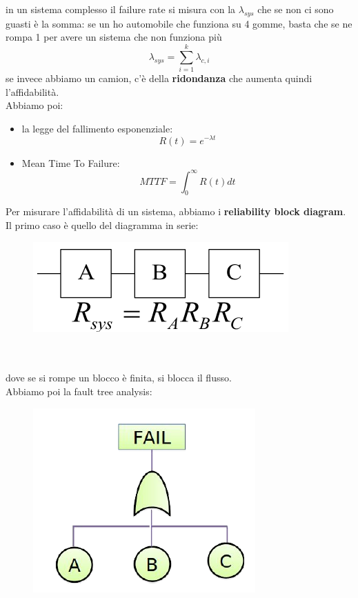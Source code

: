 \documentclass[oneside, 12pt]{extbook}
\begin{document}
in un sistema complesso il failure rate si misura con la $\lambda_{sys}$ che se non ci sono guasti è la somma: se un ho automobile che funziona su 4 gomme, basta che se ne rompa 1 per avere un sistema che non funziona più
\begin{equation}
	\lambda_{sys} = \sum\limits_{i=1}^{k} \lambda_{c,i}
\end{equation}
se invece abbiamo un camion, c'è della \textbf{ridondanza} che aumenta quindi l'affidabilità.
\\Abbiamo poi:
\begin{itemize}
	\item la legge del fallimento esponenziale:
	\begin{equation}
		R(t) = e^{-\lambda t}
	\end{equation}
	\item Mean Time To Failure:
	\begin{equation}
		MTTF = \int_{0}^{\infty} R(t) dt
	\end{equation}
\end{itemize}
Per misurare l'affidabilità di un sistema, abbiamo i \textbf{reliability block diagram}.\\Il primo caso è quello del diagramma in serie:\\
\begin{figure}[!h]
	\includegraphics[scale=0.7]{immagini/hardware/reliab_serie.png}
\end{figure}
\\\\dove se si rompe un blocco è finita, si blocca il flusso.
\\Abbiamo poi la fault tree analysis:
\begin{figure}[!h]
	\includegraphics[scale=0.7]{immagini/hardware/reliab_tree.png}
\end{figure}
\end{document}
